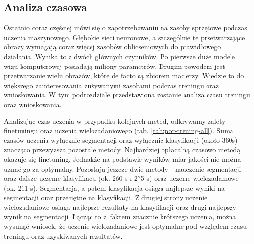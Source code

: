 \subsection{Analiza czasowa}
Ostatnio coraz częściej mówi się o zapotrzebowaniu na zasoby sprzętowe podczas uczenia maszynowego. Głębokie sieci neuronowe, a szczególnie te przetwarzające obrazy wymagają coraz więcej zasobów obliczeniowych do prawidłowego działania. Wynika to z dwóch głównych czynników. Po pierwsze duże modele wizji komputerowej posiadają miliony parametrów. Drugim powodem jest przetwarzanie wielu obrazów, które de facto są zbiorem macierzy. Wiedzie to do większego zainteresowania zużywanymi zasobami podczas treningu oraz wnioskowania. W tym podrozdziale przedstawiona zostanie analiza czasu treningu oraz wnioskowania.

Analizując czas uczenia w przypadku kolejnych metod, odkrywamy zalety finetuningu oraz uczenia wielozadaniowego (tab. \ref{tab:por-trening-all}). Suma czasów uczenia wyłącznie segmentacji oraz wyłącznie klasyfikacji (około 360s) znacząco przewyższa pozostałe metody. Najbardziej opłacalną czasowo metodą okazuje się finetuning. Jednakże na podstawie wyników miar jakości nie można uznać go za optymalny. Pozostają jeszcze dwie metody - nauczenie segmentacji oraz dalsze uczenie klasyfikacji (ok. 260 s i 275 s) oraz uczenie wielozadaniowe (ok. 211 s). Segmentacja, a potem klasyfikacja osiąga najlepsze wyniki na segmentacji oraz przeciętne na klasyfikacji. Z drugiej strony uczenie wielozadaniowe osiąga najlepsze rezultaty na klasyfikacji oraz drugi najlepszy wynik na segmentacji. Łącząc to z~faktem znacznie krótszego uczenia, można wysunąć wniosek, że uczenie wielozadaniowe jest optymalne pod względem czasu treningu oraz uzyskiwanych rezultatów.





